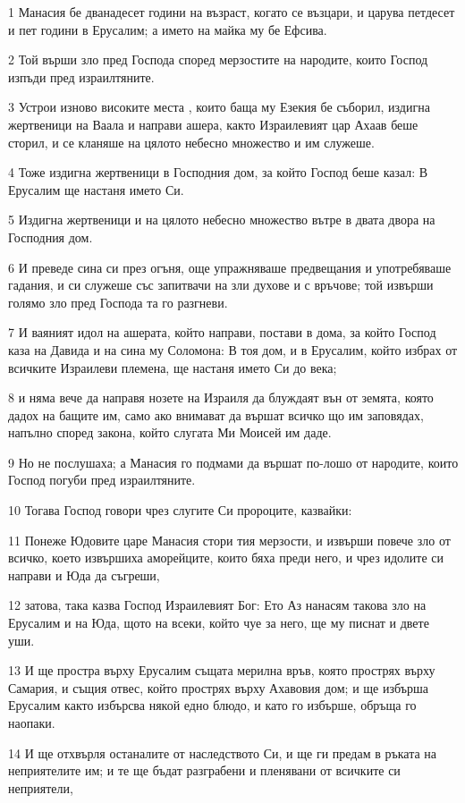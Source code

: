 \par 1 Манасия бе дванадесет години на възраст, когато се възцари, и царува петдесет и пет години в Ерусалим; а името на майка му бе Ефсива.
\par 2 Той върши зло пред Господа според мерзостите на народите, които Господ изпъди пред израилтяните.
\par 3 Устрои изново високите места , които баща му Езекия бе съборил, издигна жертвеници на Ваала и направи ашера, както Израилевият цар Ахаав беше сторил, и се кланяше на цялото небесно множество и им служеше.
\par 4 Тоже издигна жертвеници в Господния дом, за който Господ беше казал: В Ерусалим ще настаня името Си.
\par 5 Издигна жертвеници и на цялото небесно множество вътре в двата двора на Господния дом.
\par 6 И преведе сина си през огъня, още упражняваше предвещания и употребяваше гадания, и си служеше със запитвачи на зли духове и с връчове; той извърши голямо зло пред Господа та го разгневи.
\par 7 И ваяният идол на ашерата, който направи, постави в дома, за който Господ каза на Давида и на сина му Соломона: В тоя дом, и в Ерусалим, който избрах от всичките Израилеви племена, ще настаня името Си до века;
\par 8 и няма вече да направя нозете на Израиля да блуждаят вън от земята, която дадох на бащите им, само ако внимават да вършат всичко що им заповядах, напълно според закона, който слугата Ми Моисей им даде.
\par 9 Но не послушаха; а Манасия го подмами да вършат по-лошо от народите, които Господ погуби пред израилтяните.
\par 10 Тогава Господ говори чрез слугите Си пророците, казвайки:
\par 11 Понеже Юдовите царе Манасия стори тия мерзости, и извърши повече зло от всичко, което извършиха аморейците, които бяха преди него, и чрез идолите си направи и Юда да съгреши,
\par 12 затова, така казва Господ Израилевият Бог: Ето Аз нанасям такова зло на Ерусалим и на Юда, щото на всеки, който чуе за него, ще му писнат и двете уши.
\par 13 И ще простра върху Ерусалим същата мерилна връв, която прострях върху Самария, и същия отвес, който прострях върху Ахавовия дом; и ще избърша Ерусалим както избърсва някой едно блюдо, и като го избърше, обръща го наопаки.
\par 14 И ще отхвърля останалите от наследството Си, и ще ги предам в ръката на неприятелите им; и те ще бъдат разграбени и пленявани от всичките си неприятели,
